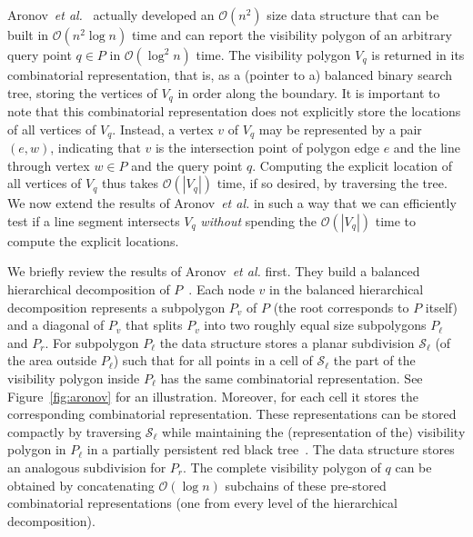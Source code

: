 \documentclass[UKenglish]{lipics-v2019}
\newcommand{\etal}{\textit{et al.}\xspace}
\newcommand{\mkmcal}[1]{\ensuremath{\mathcal{#1}}\xspace}
\renewcommand{\O}{\mkmcal{O}}
\renewcommand{\S}{\mkmcal{S}}
\begin{document}
Aronov~\etal~\cite{aronov2002visibility} actually developed an $\O(n^2)$ size
data structure that can be built in $\O(n^2\log n)$ time and can report the
visibility polygon of an arbitrary query point $q \in P$ in $\O(\log^2 n)$
time. The visibility polygon $V_q$ is returned in its combinatorial
representation, that is, as a (pointer to a) balanced binary search tree,
storing the vertices of $V_q$ in order along the boundary. It is important to
note that this combinatorial representation does not explicitly store the
locations of all vertices of $V_q$. Instead, a vertex $v$ of $V_q$ may be
represented by a pair $(e,w)$, indicating that $v$ is the intersection point of
polygon edge $e$ and the line through vertex $w \in P$ and the query point
$q$. Computing the explicit location of all vertices of $V_q$ thus takes
$\O(|V_q|)$ time, if so desired, by traversing the tree. We now extend the
results of Aronov~\etal in such a way that we can efficiently test if a line
segment intersects $V_q$ \emph{without} spending the $\O(|V_q|)$ time to
compute the explicit locations.

We briefly review the results of Aronov~\etal first. They build a
balanced hierarchical decomposition of
$P$~\cite{Chazelle1989}. Each node $v$ in the balanced
hierarchical decomposition represents a subpolygon $P_v$ of $P$ (the
root corresponds to $P$ itself) and a diagonal of $P_v$ that splits
$P_v$ into two roughly equal size subpolygons $P_\ell$ and $P_r$. For
subpolygon $P_\ell$ the data structure stores a planar subdivision
$\S_\ell$ (of the area outside $P_\ell$) such that for all points in a
cell of $\S_\ell$ the part of the visibility polygon inside $P_\ell$
has the same combinatorial representation. See Figure~\ref{fig:aronov}
for an illustration. Moreover, for each cell it stores the
corresponding combinatorial representation. These representations can
be stored compactly by traversing $\S_\ell$ while maintaining the
(representation of the) visibility polygon in $P_\ell$ in a partially
persistent red black tree~\cite{aronov2002visibility}. The data structure stores an
analogous subdivision for $P_r$. The complete visibility polygon of
$q$ can be obtained by concatenating $\O(\log n)$ subchains of these
pre-stored combinatorial representations (one from every level of the
hierarchical decomposition).
\end{document}
